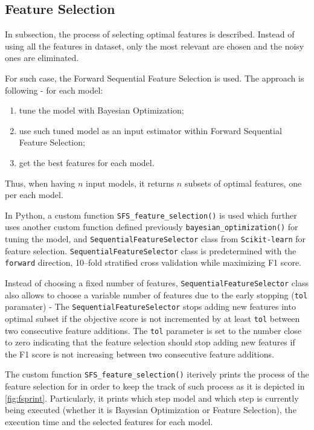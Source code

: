 \subsection{Feature Selection}
\label{subsec:feature-selection}

In subsection, the process of selecting optimal features is described. Instead of using all the features in dataset, only the most relevant are chosen and the noisy ones are eliminated.

For such case, the Forward Sequential Feature Selection is used. The approach is following - for each model:

\begin{enumerate}\setlength\itemsep{0em}
    \item tune the model with Bayesian Optimization;
    \item use such tuned model as an input estimator within Forward Sequential Feature Selection;
    \item get the best features for each model.
\end{enumerate}

Thus, when having $n$ input models, it returns $n$  subsets of optimal features, one per each model.

In Python, a custom function \lstinline{SFS_feature_selection()} is used which further uses another custom function defined previously \lstinline{bayesian_optimization()} for tuning the model, and \lstinline{SequentialFeatureSelector} class from \lstinline{Scikit-learn} for feature selection.
\lstinline{SequentialFeatureSelector} class is predetermined with the \texttt{forward} direction, 10--fold stratified cross validation while maximizing F1 score.

Instead of choosing a fixed number of features, \lstinline{SequentialFeatureSelector} class also allows to choose a variable number of features due to the early stopping (\texttt{tol} paramater) - The \lstinline{SequentialFeatureSelector} stops adding new features into optimal subset if the objective score is not incremented by at least \texttt{tol} between two consecutive feature additions\citep{scikit-learn-sequential-feature-selector}.
The \texttt{tol} parameter is set to the number close to zero indicating that the feature selection should stop adding new features if the F1 score is not increasing between two consecutive feature additions.

The custom function \lstinline{SFS_feature_selection()} iterively prints the process of the feature selection for in order to keep the track of such process as it is depicted in \autoref{fig:fsprint}.
Particularly, it prints which step model and which step is currently being executed (whether it is Bayesian Optimization or Feature Selection), the execution time and the selected features for each model.

